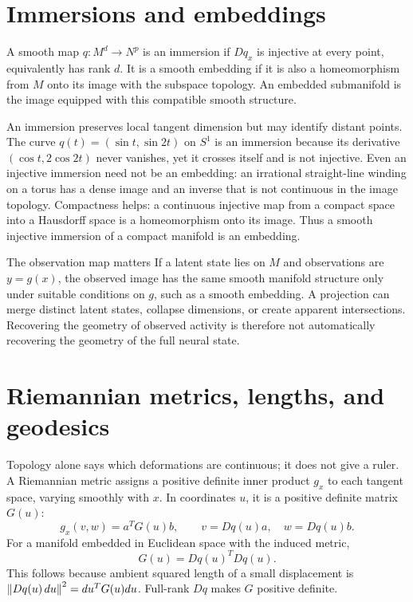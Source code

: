 \section{Immersions and embeddings}
\begin{definition}
A smooth map $q:M^d\to N^p$ is an immersion if $Dq_x$ is injective at every point, equivalently has rank $d$. It is a smooth embedding if it is also a homeomorphism from $M$ onto its image with the subspace topology. An embedded submanifold is the image equipped with this compatible smooth structure.
\end{definition}
An immersion preserves local tangent dimension but may identify distant points. The curve $q(t)=(\sin t,\sin2t)$ on $S^1$ is an immersion because its derivative $(\cos t,2\cos2t)$ never vanishes, yet it crosses itself and is not injective. Even an injective immersion need not be an embedding: an irrational straight-line winding on a torus has a dense image and an inverse that is not continuous in the image topology. Compactness helps: a continuous injective map from a compact space into a Hausdorff space is a homeomorphism onto its image. Thus a smooth injective immersion of a compact manifold is an embedding.

\begin{insight}{The observation map matters}
If a latent state lies on $M$ and observations are $y=g(x)$, the observed image has the same smooth manifold structure only under suitable conditions on $g$, such as a smooth embedding. A projection can merge distinct latent states, collapse dimensions, or create apparent intersections. Recovering the geometry of observed activity is therefore not automatically recovering the geometry of the full neural state.
\end{insight}

\section{Riemannian metrics, lengths, and geodesics}
Topology alone says which deformations are continuous; it does not give a ruler. A Riemannian metric assigns a positive definite inner product $g_x$ to each tangent space, varying smoothly with $x$. In coordinates $u$, it is a positive definite matrix $G(u)$:
\begin{equation}
g_x(v,w)=a^TG(u)b,\qquad v=Dq(u)a,\quad w=Dq(u)b.
\end{equation}
For a manifold embedded in Euclidean space with the induced metric,
\begin{equation}\label{eq:induced-metric}
G(u)=Dq(u)^TDq(u).
\end{equation}
This follows because ambient squared length of a small displacement is $\left\lVert Dq(u)\,du\right\rVert^2=du^TG(u)du$. Full-rank $Dq$ makes $G$ positive definite.

